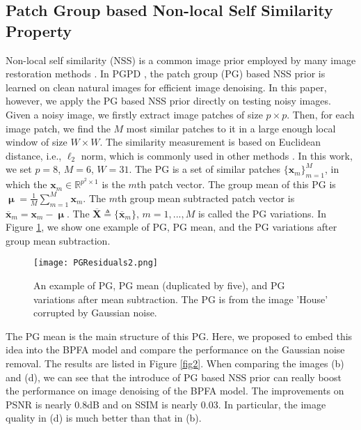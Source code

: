 \documentclass[runningheads]{llncs}
\begin{document}
\subsection{Patch Group based Non-local Self Similarity Property}
Non-local self similarity (NSS) is a common image prior employed by many image restoration methods \cite{nlm,bm3d,lssc,ncsr,wnnm,pgpd}. In PGPD \cite{pgpd}, the patch group (PG) based NSS prior is learned on clean natural images for efficient image denoising. In this paper, however, we apply the PG based NSS prior directly on testing noisy images. Given a noisy image, we firstly extract image patches of size $p\times p$. Then, for each image patch, we find the $M$ most similar patches to it in a large enough local window of size $W\times W$. The similarity measurement is based on Euclidean distance, i.e., $\ell_{2}$ norm, which is commonly used in other methods \cite{bm3d,lssc,ncsr,wnnm,pgpd}. In this work, we set $p=8$, $M=6$, $W=31$. The PG is a set of similar patches $\{\mathbf{x}_{m}\}_{m=1}^{M}$, in which the $\mathbf{x}_{m}\in \mathbb{R}^{p^{2}\times1}$ is the $m$th patch vector. The group mean of this PG is $\boldsymbol{\upmu}=\frac{1}{M}\sum_{m=1}^{M}\mathbf{x}_{m}$. The $m$th group mean subtracted patch vector is $\mathbf{\overline{x}}_{m}=\mathbf{x}_{m}-\boldsymbol{\upmu}$. The $\mathbf{\overline{X}}\triangleq \{\mathbf{\overline{x}}_{m}\}$, $m=1,...,M$ is called the PG variations. In Figure \ref{fig1}, we show one example of PG, PG mean, and the PG variations after group mean subtraction.
\begin{figure}
\centering
\texttt{[image: PGResiduals2.png]}
\vspace{-0.3in}
\caption{An example of PG, PG mean (duplicated by five), and PG variations after mean subtraction. The PG is from the image 'House' corrupted by Gaussian noise.}
\label{fig1}\vspace{-0.1in}
\end{figure}
The PG mean is the main structure of this PG. Here, we proposed to embed this idea into the BPFA model \cite{bpfa} and compare the performance on the Gaussian noise removal. The results are listed in Figure \ref{fig2}. When comparing the images (b) and (d), we can see that the introduce of PG based NSS prior can really boost the performance on image denoising of the BPFA model. The improvements on PSNR is nearly 0.8dB and on SSIM is nearly 0.03. In particular, the image quality in (d) is much better than that in (b). 
\vspace{-0.1in}
\end{document}
